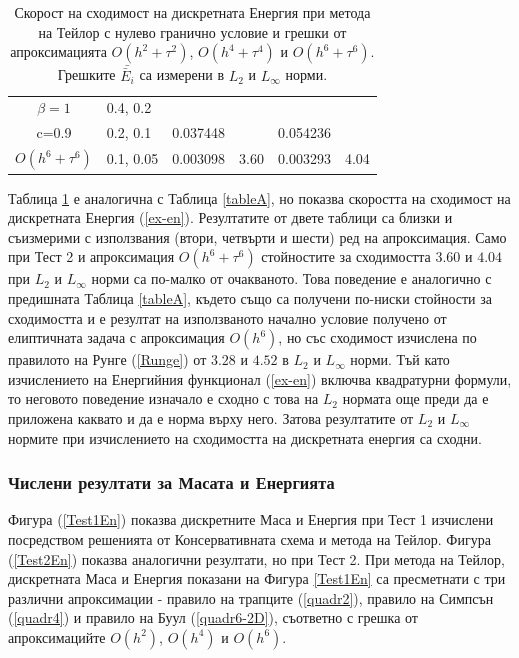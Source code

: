 \documentclass{article}
\newcommand{\rf}[1]{(\ref{#1})}
\theoremstyle{remark}
\begin{document}
\begin{table}[ht]
\begin{tabular}{||c|l|ll|ll||}
\hline
  $\beta=1$     	 	&0.4, 0.2   		&            	&         	&                  	&      \\
      c=0.9                 	&0.2, 0.1   		&0.037448	&         	& 0.054236      	&       \\
   $O(h^6+ \tau^6)$ &0.1, 0.05  		& 0.003098 	& 3.60 	& 0.003293  		& 4.04        \\
\hline
\hline 
		\end{tabular}
		\caption{Скорост на сходимост на дискретната Енергия при метода на Тейлор с нулево гранично условие и грешки от апроксимацията $O(h^{2} + \tau^2 )$, $O(h^{4} + \tau^4 )$ и $O(h^{6} + \tau^6 )$. Грешките $\bar{\bar E_i}$ са измерени в $L_2$ и $L_\infty$ норми.}
\label{tableB}
\end{table}
Таблица \ref{tableB} е аналогична с Таблица \ref{tableA}, но показва скоростта на сходимост на дискретната Енергия \rf{ex-en}. Резултатите от двете таблици са близки и съизмерими с използвания (втори, четвърти и шести) ред на апроксимация. Само при  Тест 2 и апроксимация $O(h^6 + \tau^6)$ стойностите за сходимостта $3.6$0 и $4.04$ при $L_2$ и $L_{\infty}$ норми са по-малко от очакваното. Това поведение е аналогично с предишната Таблица \ref{tableA}, където също са получени по-ниски стойности за сходимостта и е резултат на използваното начално условие получено от елиптичната задача с апроксимация $O(h^6)$, но със сходимост изчислена по правилото на Рунге \rf{Runge} от $3.28$ и $4.52$ в $L_2$ и $L_\infty$ норми. Тъй като изчислението на Енергийния функционал \rf{ex-en} включва квадратурни формули, то неговото поведение изначало е сходно с това на $L_2$ нормата още преди да е приложена каквато и да е норма върху него. Затова резултатите от $L_2$ и $L_\infty$ нормите при изчислението на сходимостта на дискретната енергия са сходни.

\subsubsection{Числени резултати за Масата и Енергията}
Фигура \rf{Test1En} показва дискретните Маса и Енергия при Тест 1 изчислени посредством решенията от Консервативната схема и метода на Тейлор. Фигура \rf{Test2En} показва аналогични резултати, но при Тест 2. При метода на Тейлор, дискретната Маса и Енергия показани на Фигура \ref{Test1En} са пресметнати с три различни апроксимации - правило на трапците \rf{quadr2}, правило на Симпсън \rf{quadr4} и правило на Буул \rf{quadr6-2D}, съответно с грешка от апроксимацийте $O(h^2)$, $O(h^4)$ и $O(h^6)$. 
\end{document}
